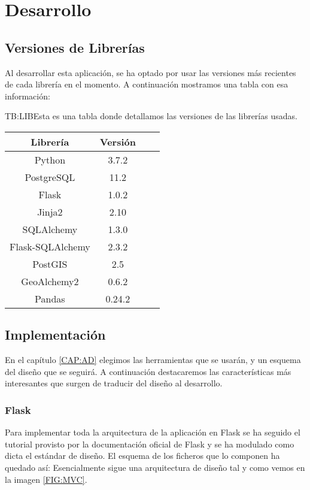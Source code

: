 
\chapter{Desarrollo\label{CAP:DESARROLLO}}
  \section{Versiones de Librerías}
    Al desarrollar esta aplicación, se ha optado por usar las versiones más recientes de cada librería en el momento. A continuación mostramos una tabla con esa información:

    \begin{table}[Tabla de versiones de librerías]{TB:LIB}{Esta es una tabla donde detallamos las versiones de las librerías usadas.}
      \begin{tabular}{cccc}
        \hline
        \textbf{Librería} & \textbf{Versión} \\
        \hline \hline
        Python & 3.7.2 \\
        PostgreSQL & 11.2 \\
        Flask & 1.0.2 \\
        Jinja2 & 2.10 \\
        SQLAlchemy & 1.3.0 \\ 
        Flask-SQLAlchemy & 2.3.2 \\
        PostGIS & 2.5 \\
        GeoAlchemy2 & 0.6.2 \\
        Pandas & 0.24.2 \\
        \hline
      \end{tabular}
    \end{table}
  
  
  \section{Implementación}
    En el capítulo \ref{CAP:AD} elegimos las herramientas que se usarán, y un esquema del diseño que se seguirá. A continuación destacaremos las características más interesantes que surgen de traducir del diseño al desarrollo.
    
    \subsection{Flask}
      Para implementar toda la arquitectura de la aplicación en Flask se ha seguido el tutorial provisto por la documentación oficial de Flask \cite{flask} y se ha modulado como dicta el estándar de diseño. El esquema de los ficheros que lo componen ha quedado así:
      Esencialmente sigue una arquitectura de diseño  tal y como vemos en la imagen \ref{FIG:MVC}.
      
